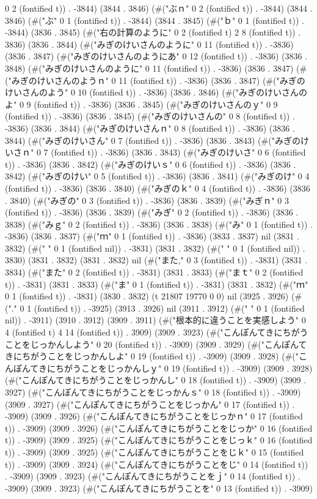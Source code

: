 0 2 (fontified t)) . -3844) (3844 . 3846) (#("ぶｎ" 0 2 (fontified t)) . -3844) (3844 . 3846) (#("ぶ" 0 1 (fontified t)) . -3844) (3844 . 3845) (#("ｂ" 0 1 (fontified t)) . -3844) (3836 . 3845) (#("右の計算のように" 0 2 (fontified t) 2 8 (fontified t)) . 3836) (3836 . 3844) (#("みぎのけいさんのように" 0 11 (fontified t)) . -3836) (3836 . 3847) (#("みぎのけいさんのようにあ" 0 12 (fontified t)) . -3836) (3836 . 3848) (#("みぎのけいさんのように" 0 11 (fontified t)) . -3836) (3836 . 3847) (#("みぎのけいさんのようｎ" 0 11 (fontified t)) . -3836) (3836 . 3847) (#("みぎのけいさんのよう" 0 10 (fontified t)) . -3836) (3836 . 3846) (#("みぎのけいさんのよ" 0 9 (fontified t)) . -3836) (3836 . 3845) (#("みぎのけいさんのｙ" 0 9 (fontified t)) . -3836) (3836 . 3845) (#("みぎのけいさんの" 0 8 (fontified t)) . -3836) (3836 . 3844) (#("みぎのけいさんｎ" 0 8 (fontified t)) . -3836) (3836 . 3844) (#("みぎのけいさん" 0 7 (fontified t)) . -3836) (3836 . 3843) (#("みぎのけいさｎ" 0 7 (fontified t)) . -3836) (3836 . 3843) (#("みぎのけいさ" 0 6 (fontified t)) . -3836) (3836 . 3842) (#("みぎのけいｓ" 0 6 (fontified t)) . -3836) (3836 . 3842) (#("みぎのけい" 0 5 (fontified t)) . -3836) (3836 . 3841) (#("みぎのけ" 0 4 (fontified t)) . -3836) (3836 . 3840) (#("みぎのｋ" 0 4 (fontified t)) . -3836) (3836 . 3840) (#("みぎの" 0 3 (fontified t)) . -3836) (3836 . 3839) (#("みぎｎ" 0 3 (fontified t)) . -3836) (3836 . 3839) (#("みぎ" 0 2 (fontified t)) . -3836) (3836 . 3838) (#("みｇ" 0 2 (fontified t)) . -3836) (3836 . 3838) (#("み" 0 1 (fontified t)) . -3836) (3836 . 3837) (#("ｍ" 0 1 (fontified t)) . -3836) (3833 . 3837) nil (3831 . 3832) (#(" " 0 1 (fontified nil)) . -3831) (3831 . 3832) (#(" " 0 1 (fontified nil)) . 3830) (3831 . 3832) (3831 . 3832) nil (#("また," 0 3 (fontified t)) . -3831) (3831 . 3834) (#("また" 0 2 (fontified t)) . -3831) (3831 . 3833) (#("まｔ" 0 2 (fontified t)) . -3831) (3831 . 3833) (#("ま" 0 1 (fontified t)) . -3831) (3831 . 3832) (#("ｍ" 0 1 (fontified t)) . -3831) (3830 . 3832) (t 21807 19770 0 0) nil (3925 . 3926) (#("." 0 1 (fontified t)) . -3925) (3913 . 3926) nil (3911 . 3912) (#(" " 0 1 (fontified nil)) . -3911) (3910 . 3912) (3909 . 3911) (#("根本的に違うことを実感しよう" 0 4 (fontified t) 4 14 (fontified t)) . 3909) (3909 . 3923) (#("こんぽんてきにちがうことをじっかんしよう" 0 20 (fontified t)) . -3909) (3909 . 3929) (#("こんぽんてきにちがうことをじっかんしよ" 0 19 (fontified t)) . -3909) (3909 . 3928) (#("こんぽんてきにちがうことをじっかんしｙ" 0 19 (fontified t)) . -3909) (3909 . 3928) (#("こんぽんてきにちがうことをじっかんし" 0 18 (fontified t)) . -3909) (3909 . 3927) (#("こんぽんてきにちがうことをじっかんｓ" 0 18 (fontified t)) . -3909) (3909 . 3927) (#("こんぽんてきにちがうことをじっかん" 0 17 (fontified t)) . -3909) (3909 . 3926) (#("こんぽんてきにちがうことをじっかｎ" 0 17 (fontified t)) . -3909) (3909 . 3926) (#("こんぽんてきにちがうことをじっか" 0 16 (fontified t)) . -3909) (3909 . 3925) (#("こんぽんてきにちがうことをじっｋ" 0 16 (fontified t)) . -3909) (3909 . 3925) (#("こんぽんてきにちがうことをじｋ" 0 15 (fontified t)) . -3909) (3909 . 3924) (#("こんぽんてきにちがうことをじ" 0 14 (fontified t)) . -3909) (3909 . 3923) (#("こんぽんてきにちがうことをｊ" 0 14 (fontified t)) . -3909) (3909 . 3923) (#("こんぽんてきにちがうことを" 0 13 (fontified t)) . -3909) 